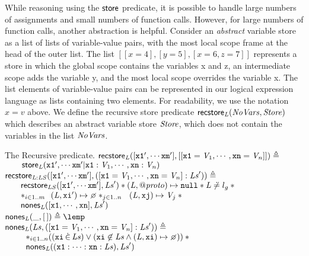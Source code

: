 \documentclass{article}
\begin{document}
While reasoning using the $\mathsf{store}$ predicate, it is possible to handle large
numbers of assignments and small numbers of function calls. However, for large numbers of 
function calls, another abstraction is helpful.  
Consider an {\em  abstract}  variable store as a list
of lists of variable-value pairs, with the most local scope frame at the head
of the outer list. The list \mbox{$[[x=4], [y=5], [x=6,z=7]]$} represents a
store in which the global scope contains the variables x and z, an intermediate
scope adds the variable y, and the most local scope overrides the variable x.
The list elements of variable-value pairs can be represented in our logical
expression language as lists containing two elements. For readability, we use
the notation $x=v$ above.  
%
        We define the recursive store predicate $\mathsf{recstore}_{{\mathit{L}}}({\mathit{NoVars}}, {\mathit{Store}})$ which describes an abstract variable store ${\mathit{Store}}$, which does not contain the variables in the list ${\mathit{NoVars}}$.%
\begin{display}{The Recursive \recstore predicate.}
$        \mathsf{recstore}_{{\mathit{L}}}([\mbox{\texttt{{\upshape x1}}}',\cdots\mbox{\texttt{{\upshape xm}}}'], [[\mbox{\texttt{{\upshape x1}}}={\mathit{V}}_1,\cdots,\mbox{\texttt{{\upshape xn}}}={\mathit{V}}_n]]) \triangleq $\\
$        \qquad \mathsf{store}_{{\mathit{L}}}(\mbox{\texttt{{\upshape x1}}}',\cdots\mbox{\texttt{{\upshape xm}}}'|\mbox{\texttt{{\upshape x1}}}:{\mathit{V}}_1,\cdots,\mbox{\texttt{{\upshape xn}}}:{\mathit{V}}_n) $\\[\gap]
        
        
$        \mathsf{recstore}_{{\mathit{L}}:{\mathit{LS}}}([\mbox{\texttt{{\upshape x1}}}',\cdots\mbox{\texttt{{\upshape xm}}}'],([\mbox{\texttt{{\upshape x1}}}={\mathit{V}}_1,\cdots,\mbox{\texttt{{\upshape xn}}}={\mathit{V}}_n] : {\mathit{Ls}}')) \triangleq $\\
 $       ~~~~\begin{array}[t]{l}
                \recstore_{\E{LS}}([\js{x1}',\cdots\js{xm}'],\E{Ls}') \sep {} 
                (\E{L},\protop)\pointsto\nil \sep \E{L}\not\doteq \lgo \sep {} \\
                \sep_{i\in 1..m}~~(\E{L},\js{xi}')\pointsto\none 
                \sep_{j\in 1..n}~~(\E{L},\js{xj})\pointsto\E{V}_j \sep {}\\
                \nones_{\E{L}}([\js{x1},\cdots,\js{xn}] , \E{Ls}')
        \end{array}\Gap$\\[\gap]
        
        
$        \nones_{\E{L}}(\_ , {\emptylist}) \triangleq \lemp $\\[\gap]
        
        
$        \nones_{\E{L}}(\E{Ls},([\js{x1}=\E{V}_1,\cdots,\js{xn}=\E{V}_n] : \E{Ls}')) \triangleq $\\
$        \qquad\begin{array}[t]{l}
                \sep_{i\in 1..n}((\js{xi}\dotin\E{Ls}) \lor (\js{xi}\not\elem\E{Ls} \land (\E{L},\js{xi})\pointsto\none)) \sep {} \\
                
                \nones_{\E{L}}((\js{x1}:\cdots:\js{xn}:\E{Ls}), \E{Ls}')
        \end{array}$
%
\end{display}
\end{document}
